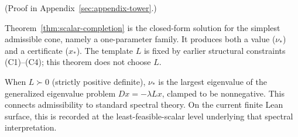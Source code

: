 (Proof in Appendix~\ref{sec:appendix-tower}.)

\begin{remark}
\label{rem:compiler-output}
Theorem~\ref{thm:scalar-completion} is the closed-form solution for the
simplest admissible cone, namely a one-parameter family.
It produces both a value ($\nu_*$) and a certificate ($x_*$).
The template $L$ is fixed by earlier structural constraints (C1)--(C4); this theorem does not choose $L$.
\end{remark}

\begin{remark}
\label{rem:generalized-eigenvalue}
When $L \succ 0$ (strictly positive definite), $\nu_*$ is the largest eigenvalue of the generalized eigenvalue problem $D x = -\lambda L x$, clamped to be nonnegative.
This connects admissibility to standard spectral theory.
On the current finite Lean surface, this is recorded at the least-feasible-scalar level underlying that spectral interpretation.
\end{remark}
